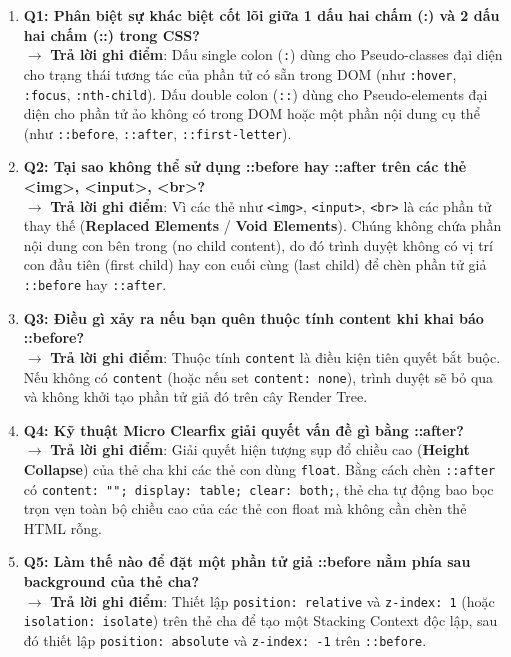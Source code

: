 \documentclass[11pt,oneside]{book}
\newcommand{\codeinline}[1]{\textcolor{accentOrange}{\texttt{#1}}}
\newcommand{\term}[1]{\textbf{\textcolor{primaryBlue}{#1}}}
\begin{document}
\begin{tipBox}
\begin{enumerate}[leftmargin=1.5em, itemsep=4pt, parsep=0pt]
    \item \textbf{Q1: Phân biệt sự khác biệt cốt lõi giữa 1 dấu hai chấm (:) và 2 dấu hai chấm (::) trong CSS?} \\
    $\rightarrow$ \textbf{Trả lời ghi điểm}: Dấu single colon (\codeinline{:}) dùng cho Pseudo-classes đại diện cho trạng thái tương tác của phần tử có sẵn trong DOM (như \codeinline{:hover}, \codeinline{:focus}, \codeinline{:nth-child}). Dấu double colon (\codeinline{::}) dùng cho Pseudo-elements đại diện cho phần tử ảo không có trong DOM hoặc một phần nội dung cụ thể (như \codeinline{::before}, \codeinline{::after}, \codeinline{::first-letter}).
    \item \textbf{Q2: Tại sao không thể sử dụng ::before hay ::after trên các thẻ <img>, <input>, <br>?} \\
    $\rightarrow$ \textbf{Trả lời ghi điểm}: Vì các thẻ như \codeinline{<img>}, \codeinline{<input>}, \codeinline{<br>} là các phần tử thay thế (\term{Replaced Elements} / \term{Void Elements}). Chúng không chứa phần nội dung con bên trong (no child content), do đó trình duyệt không có vị trí con đầu tiên (first child) hay con cuối cùng (last child) để chèn phần tử giả \codeinline{::before} hay \codeinline{::after}.
    \item \textbf{Q3: Điều gì xảy ra nếu bạn quên thuộc tính content khi khai báo ::before?} \\
    $\rightarrow$ \textbf{Trả lời ghi điểm}: Thuộc tính \codeinline{content} là điều kiện tiên quyết bắt buộc. Nếu không có \codeinline{content} (hoặc nếu set \codeinline{content: none}), trình duyệt sẽ bỏ qua và không khởi tạo phần tử giả đó trên cây Render Tree.
    \item \textbf{Q4: Kỹ thuật Micro Clearfix giải quyết vấn đề gì bằng ::after?} \\
    $\rightarrow$ \textbf{Trả lời ghi điểm}: Giải quyết hiện tượng sụp đổ chiều cao (\term{Height Collapse}) của thẻ cha khi các thẻ con dùng \codeinline{float}. Bằng cách chèn \codeinline{::after} có \codeinline{content: ""; display: table; clear: both;}, thẻ cha tự động bao bọc trọn vẹn toàn bộ chiều cao của các thẻ con float mà không cần chèn thẻ HTML rỗng.
    \item \textbf{Q5: Làm thế nào để đặt một phần tử giả ::before nằm phía sau background của thẻ cha?} \\
    $\rightarrow$ \textbf{Trả lời ghi điểm}: Thiết lập \codeinline{position: relative} và \codeinline{z-index: 1} (hoặc \codeinline{isolation: isolate}) trên thẻ cha để tạo một Stacking Context độc lập, sau đó thiết lập \codeinline{position: absolute} và \codeinline{z-index: -1} trên \codeinline{::before}.
\end{enumerate}
\end{tipBox}
\end{document}
